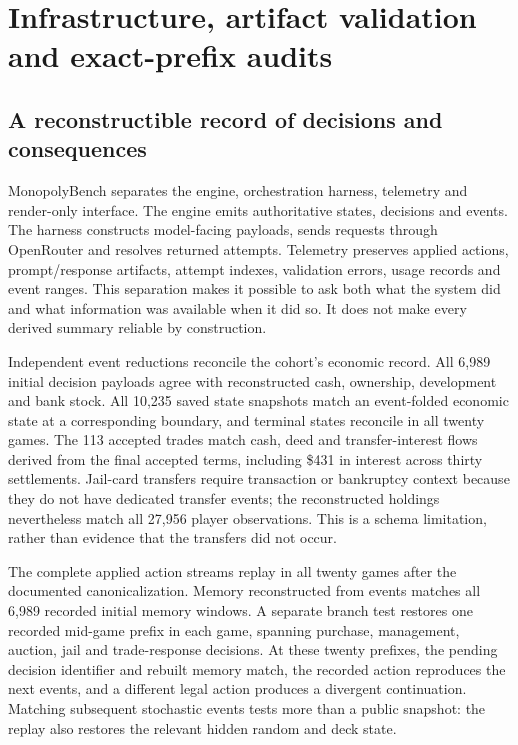 \section{Infrastructure, artifact validation and exact-prefix audits}
\label{sec:validation}

\subsection{A reconstructible record of decisions and consequences}

MonopolyBench separates the engine, orchestration harness, telemetry and render-only interface. The engine emits authoritative states, decisions and events. The harness constructs model-facing payloads, sends requests through OpenRouter and resolves returned attempts. Telemetry preserves applied actions, prompt/response artifacts, attempt indexes, validation errors, usage records and event ranges. This separation makes it possible to ask both what the system did and what information was available when it did so. It does not make every derived summary reliable by construction.

Independent event reductions reconcile the cohort's economic record. All 6,989 initial decision payloads agree with reconstructed cash, ownership, development and bank stock. All 10,235 saved state snapshots match an event-folded economic state at a corresponding boundary, and terminal states reconcile in all twenty games. The 113 accepted trades match cash, deed and transfer-interest flows derived from the final accepted terms, including \$431 in interest across thirty settlements. Jail-card transfers require transaction or bankruptcy context because they do not have dedicated transfer events; the reconstructed holdings nevertheless match all 27,956 player observations. This is a schema limitation, rather than evidence that the transfers did not occur.

The complete applied action streams replay in all twenty games after the documented canonicalization. Memory reconstructed from events matches all 6,989 recorded initial memory windows. A separate branch test restores one recorded mid-game prefix in each game, spanning purchase, management, auction, jail and trade-response decisions. At these twenty prefixes, the pending decision identifier and rebuilt memory match, the recorded action reproduces the next events, and a different legal action produces a divergent continuation. Matching subsequent stochastic events tests more than a public snapshot: the replay also restores the relevant hidden random and deck state.

